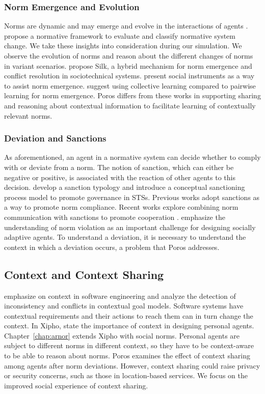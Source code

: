 \documentclass[11pt,          %
               phd,           %
               onehalfspacing %
               ]{ncsuthesis}
\newcommand{\frameworkB}{Poros\xspace}
\begin{document}
\subsubsection{Norm Emergence and Evolution}
Norms are dynamic and may emerge and
evolve in the interactions of agents
\citep{Savarimuthu2009NormEmergence}. \citet{Boella2009Change} propose a normative framework to evaluate and
classify normative system change. We take these insights into
consideration during our simulation. We observe the evolution of norms
and reason about the different changes of norms in variant scenarios.
\citet{Mashayekhi-IJCAI16-Silk} propose Silk, a hybrid
mechanism for norm emergence and conflict resolution in sociotechnical
systems. \citet{Villatoro-TAAS13-Robust} present social
instruments as a way to assist norm emergence. 
\citet{Yu-AAMAS13-Emergence} suggest using collective learning compared
to pairwise learning for norm emergence. \frameworkB differs from these
works in supporting sharing and reasoning about contextual information
to facilitate learning of contextually relevant norms.

\subsubsection{Deviation and Sanctions}
As aforementioned, an agent in a normative system can decide whether to
comply with or deviate from a norm. The notion of sanction, which can
either be negative or positive, is associated with the reaction of other
agents to this decision. \citet{Nardin-KER16-Classifying}
develop a sanction typology and introduce a conceptual sanctioning
process model to promote governance in STSs. Previous works adopt
sanctions as a way to promote norm compliance. Recent works explore
combining norm communication with sanctions to promote cooperation
\citep{Andrighetto-2013-PunishVoice}. 
 emphasize the understanding of norm
violation as an important challenge for designing socially adaptive
agents. To understand a deviation, it is necessary to understand the
context in which a deviation occurs, a problem that \frameworkB
addresses.

\subsection{Context and Context Sharing}
\citet{Ali-2013-Reasoning} emphasize on context in software
engineering and analyze the detection of inconsistency and conflicts in
contextual goal models. Software systems have contextual requirements
and their actions to reach them can in turn change the context. In
Xipho, \citet{Murukannaiah-AAMAS14-Xipho} state the
importance of context in designing personal agents. 
Chapter~\ref{chap:arnor} extends Xipho with social norms. Personal
agents are subject to different norms in different context, so they have
to be context-aware to be able to reason about norms. \frameworkB
examines the effect of context sharing among agents after norm
deviations. However, context sharing could raise privacy or security
concerns, such as those in location-based services. We focus on the
improved social experience of context sharing.
\end{document}
